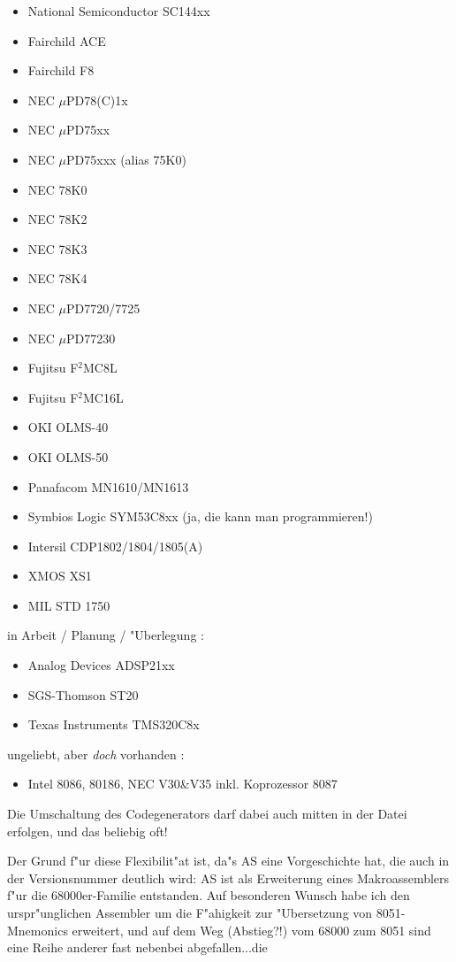 \documentclass[12pt,a4paper,twoside]{report}
\begin{document}
\begin{itemize}
\item{National Semiconductor SC144xx}
\item{Fairchild ACE}
\item{Fairchild F8}
\item{NEC $\mu$PD78(C)1x}
\item{NEC $\mu$PD75xx}
\item{NEC $\mu$PD75xxx (alias 75K0)}
\item{NEC 78K0}
\item{NEC 78K2}
\item{NEC 78K3}
\item{NEC 78K4}
\item{NEC $\mu$PD7720/7725}
\item{NEC $\mu$PD77230}
\item{Fujitsu F$^2$MC8L}
\item{Fujitsu F$^2$MC16L}
\item{OKI OLMS-40}
\item{OKI OLMS-50}
\item{Panafacom MN1610/MN1613}
\item{Symbios Logic SYM53C8xx (ja, die kann man programmieren!)}
\item{Intersil CDP1802/1804/1805(A)}
\item{XMOS XS1}
\item{MIL STD 1750}
\end{itemize}
in Arbeit / Planung / "Uberlegung :
\begin{itemize}
\item{Analog Devices ADSP21xx}
\item{SGS-Thomson ST20}
\item{Texas Instruments TMS320C8x}
\end{itemize}
ungeliebt, aber {\it doch} vorhanden :
\begin{itemize}
\item{Intel 8086, 80186, NEC V30\&V35 inkl. Koprozessor 8087}
\end{itemize}
Die Umschaltung des Codegenerators darf dabei auch mitten in der Datei
erfolgen, und das beliebig oft!
\par
Der Grund f"ur diese Flexibilit"at ist, da"s AS eine Vorgeschichte hat,
die auch in der Versionsnummer deutlich wird: AS ist als Erweiterung eines
Makroassemblers f"ur die 68000er-Familie entstanden.  Auf besonderen
Wunsch habe ich den urspr"unglichen Assembler um die F"ahigkeit zur
"Ubersetzung von 8051-Mnemonics erweitert, und auf dem Weg (Abstieg?!) vom
68000 zum 8051 sind eine Reihe anderer fast nebenbei abgefallen...die
\end{document}
